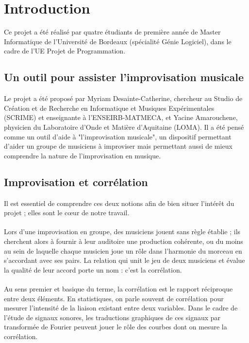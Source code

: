 
\section{Introduction}
\paragraph{}
Ce projet a été réalisé par quatre étudiants de première année de
Master Informatique de l'Université de Bordeaux (spécialité Génie
Logiciel), dans le cadre de l'UE Projet de Programmation.

\subsection{Un outil pour assister l'improvisation musicale}
\paragraph{}
Le projet a été proposé par Myriam Desainte-Catherine, chercheur au
Studio de Création et de Recherche en Informatique et Musiques
Expérimentales (SCRIME) et enseignante à l'ENSEIRB-MATMECA, et Yacine
Amarouchene, physicien du Laboratoire d'Onde et Matière d'Aquitaine
(LOMA). Il a été pensé comme un outil d'aide à "l'improvisation
musicale", un dispositif permettant d'aider un groupe de musiciens à
improviser mais permettant aussi de mieux comprendre la nature de
l'improvisation en musique.

\subsection{Improvisation et corrélation}
\paragraph{}
Il est essentiel de comprendre ces deux notions afin de bien situer
l'intérêt du projet ; elles sont le c\oe ur de notre travail.
\paragraph{}
Lors d'une improvisation en groupe, des musiciens jouent sans règle
établie ; ils cherchent alors à fournir à leur auditoire une
production cohérente, ou du moins au sein de laquelle chaque musicien
joue un rôle dans l'harmonie du morceau en s'accordant avec ses
pairs. La relation qui unit le jeu de deux musiciens et évalue la
qualité de leur accord porte un nom : c'est la corrélation.
\paragraph{}
Au sens premier et basique du terme, la corrélation est le rapport
réciproque entre deux éléments. En statistiques, on parle souvent de
corrélation pour mesurer l'intensité de la liaison existant entre deux
variables. Dans le cadre de l'étude de signaux sonores, les
traductions graphiques de ces signaux par transformée de Fourier
peuvent jouer le rôle des courbes dont on mesure la corrélation.
